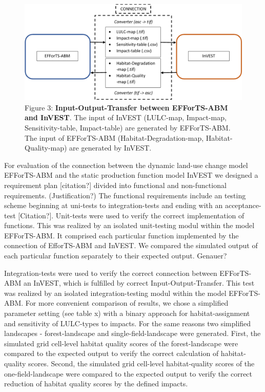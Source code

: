\documentclass[
]{article}
\begin{document}
\begin{figure}
\centering
\includegraphics{figures/png/Input-Output-Transfer.png}
\caption{Figure 3: \textbf{Input-Output-Transfer between EFForTS-ABM and
InVEST}. The input of InVEST (LULC-map, Impact-map, Sensitivity-table,
Impact-table) are generated by EFForTS-ABM. The input of EFForTS-ABM
(Habitat-Degradation-map, Habitat-Quality-map) are generated by InVEST.}
\end{figure}

For evaluation of the connection between the dynamic land-use change
model EFForTS-ABM and the static production function model InVEST we
designed a requirement plan {[}citation?{]} divided into functional and
non-functional requirements. (Justification?) The functional
requirements include an testing scheme beginning at uni-tests to
integration-tests and ending with an acceptance-test {[}Citation?{]}.
Unit-tests were used to verify the correct implementation of functions.
This was realized by an isolated unit-testing modul within the model
EFForTS-ABM. It comprised each particular function implemented by the
connection of EfforTS-ABM and InVEST. We compared the simulated output
of each particular function separately to their expected output.
Genauer?

Integration-tests were used to verify the correct connection between
EFForTS-ABM an InVEST, which is fulfilled by correct
Input-Output-Transfer. This test was realized by an isolated
integration-testing modul within the model EFForTS-ABM. For more
convenient comparison of results, we chose a simplified parameter
setting (see table x) with a binary approach for habitat-assignment and
sensitivity of LULC-types to impacts. For the same reasons two
simplified landscapes - forest-landscape and single-field-landscape were
generated. First, the simulated grid cell-level habitat quality scores
of the forest-landscape were compared to the expected output to verify
the correct calculation of habitat-quality scores. Second, the simulated
grid cell-level habitat-quality scores of the one-field-landscape were
compared to the expected output to verify the correct reduction of
habitat quality scores by the defined impacts.
\end{document}
